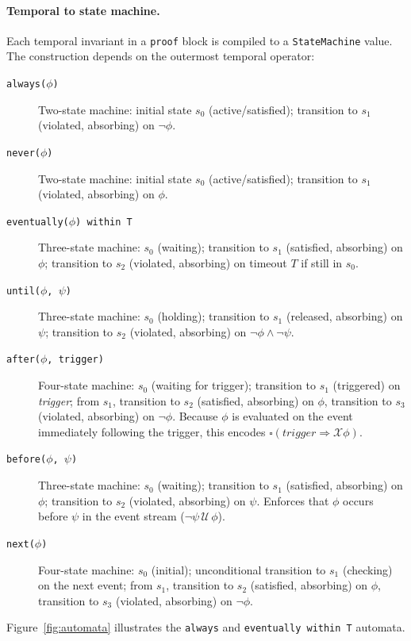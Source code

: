 \documentclass[sigconf]{acmart}
\begin{document}
\paragraph{Temporal to state machine.}
Each temporal invariant in a \texttt{proof} block is compiled to a
\texttt{StateMachine} value. The construction depends on the outermost temporal
operator:

\begin{description}
  \item[\texttt{always($\phi$)}] Two-state machine: initial state $s_0$
    (active/satisfied); transition to $s_1$ (violated, absorbing) on
    $\neg\phi$.
  \item[\texttt{never($\phi$)}] Two-state machine: initial state $s_0$
    (active/satisfied); transition to $s_1$ (violated, absorbing) on $\phi$.
  \item[\texttt{eventually($\phi$) within T}] Three-state machine: $s_0$
    (waiting); transition to $s_1$ (satisfied, absorbing) on $\phi$; transition
    to $s_2$ (violated, absorbing) on timeout $T$ if still in $s_0$.
  \item[\texttt{until($\phi$, $\psi$)}] Three-state machine: $s_0$ (holding);
    transition to $s_1$ (released, absorbing) on $\psi$; transition to $s_2$
    (violated, absorbing) on $\neg\phi \wedge \neg\psi$.
  \item[\texttt{after($\phi$, trigger)}] Four-state machine: $s_0$ (waiting
    for trigger); transition to $s_1$ (triggered) on \textit{trigger};
    from $s_1$, transition to $s_2$ (satisfied, absorbing) on $\phi$, transition
    to $s_3$ (violated, absorbing) on $\neg\phi$. Because $\phi$ is evaluated on
    the event immediately following the trigger, this encodes
    $\square(\textit{trigger} \Rightarrow \mathcal{X}\phi)$.
  \item[\texttt{before($\phi$, $\psi$)}] Three-state machine: $s_0$ (waiting);
    transition to $s_1$ (satisfied, absorbing) on $\phi$; transition to $s_2$
    (violated, absorbing) on $\psi$. Enforces that $\phi$ occurs before $\psi$
    in the event stream ($\neg\psi \,\mathcal{U}\, \phi$).
  \item[\texttt{next($\phi$)}] Four-state machine: $s_0$ (initial); unconditional
    transition to $s_1$ (checking) on the next event; from $s_1$, transition to
    $s_2$ (satisfied, absorbing) on $\phi$, transition to $s_3$ (violated,
    absorbing) on $\neg\phi$.
\end{description}

Figure~\ref{fig:automata} illustrates the \texttt{always} and
\texttt{eventually within T} automata.
\end{document}
